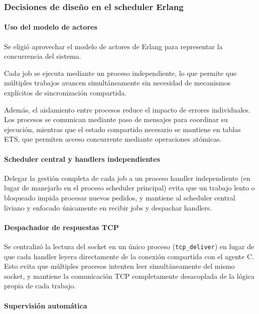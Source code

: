 \documentclass[a4paper,10pt]{article}
\begin{document}
\subsubsection{Decisiones de diseño en el scheduler Erlang}

\paragraph{Uso del modelo de actores}

Se eligió aprovechar el modelo de actores de Erlang para representar la concurrencia del sistema.

\noindent Cada job se ejecuta mediante un proceso independiente, lo que permite que múltiples trabajos avancen simultáneamente sin necesidad de mecanismos explícitos de sincronización compartida.

\noindent Además, el aislamiento entre procesos reduce el impacto de errores individuales.
Los procesos se comunican mediante paso de mensajes para coordinar su ejecución, mientras que el estado compartido necesario se mantiene en tablas ETS, que permiten acceso concurrente mediante operaciones atómicas.
\paragraph{Scheduler central y handlers independientes}

Delegar la gestión completa de cada job a un proceso handler independiente
(en lugar de manejarlo en el proceso scheduler principal) evita que un
trabajo lento o bloqueado impida procesar nuevos pedidos, y mantiene al
scheduler central liviano y enfocado únicamente en recibir jobs y despachar
handlers.

\paragraph{Despachador de respuestas TCP}

Se centralizó la lectura del socket en un único proceso (\texttt{tcp\_deliver}) en
lugar de que cada handler leyera directamente de la conexión compartida con el
agente C. Esto evita que múltiples procesos intenten leer simultáneamente del mismo
socket, y mantiene la comunicación TCP completamente desacoplada de la lógica
propia de cada trabajo.

\paragraph{Supervisión automática}
\end{document}
